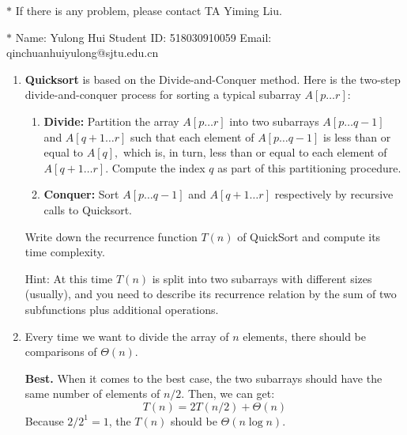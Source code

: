 \documentclass[12pt,a4paper]{article}
\makeatletter
\newtheorem*{solution}{Solution}
\theoremstyle{definition}
\renewenvironment{solution}[1][Solution] {\par\pushQED{\qed}\normalfont\topsep6\p@\@plus6\p@\relax\trivlist\item[\hskip\labelsep\bfseries#1\@addpunct{.}]\ignorespaces}{\popQED\endtrivlist\@endpefalse} \makeatother
\makeatother
\begin{document}
\noindent

\noindent{}
\begin{center}
\footnotesize{\color{red}$*$ If there is any problem, please contact TA Yiming Liu.}

\footnotesize{\color{blue}$*$ Name: Yulong Hui \quad Student ID: 518030910059 \quad Email: qinchuanhuiyulong@sjtu.edu.cn}
\end{center}

\begin{enumerate}
    \item
    \textbf{Quicksort} is based on the Divide-and-Conquer method. Here is the two-step divide-and-conquer process for sorting a typical subarray $A[p \ldots r]$:
    \begin{enumerate}

    	\item
    	\textbf{Divide:} Partition the array $A[p \ldots r]$ into two subarrays $A[p \ldots q-1]$ and $A[q+1 \ldots r]$ such that each element of $A[p \ldots q-1]$ is less than or equal to $A[q],$ which is, in turn, less than or equal to each element of $A[q+1 \ldots r].$ Compute the index $q$ as part of this partitioning procedure.
    	
    	\item
    	\textbf{Conquer:} Sort $A[p \ldots q-1]$ and $A[q+1 \ldots r]$ respectively by recursive calls to Quicksort.
    	
    \end{enumerate}
    Write down the recurrence function $T(n)$ of QuickSort and compute its time complexity.

    {\color{purple}Hint: At this time $T(n)$ is split into two subarrays with different sizes (usually), and you need to describe its recurrence relation by the sum of two subfunctions plus additional operations.}
    
    \begin{solution}
     Every time we want to divide the array of $n$ elements, there should be comparisons of $\Theta(n)$.
     
     \textbf{Best.} When it comes to the best case, the two subarrays should have the same number of elements of $n/2$. Then, we can get:
       $$T(n)=2T(n/2)+\Theta(n)$$
       Because ${2}/{2^1}=1$, the $T(n)$ should be $\Theta(n\log n)$.
       

\end{solution}
\end{enumerate}
\end{document}
